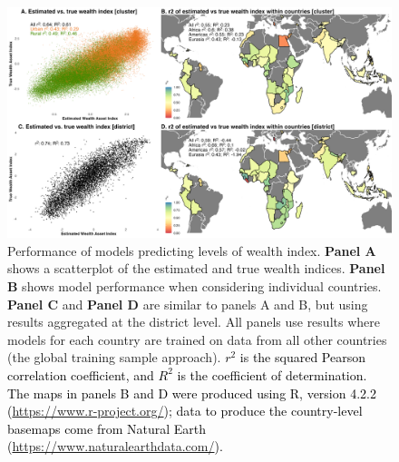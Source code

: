 \documentclass{article}
\begin{document}
\begin{figure}[H]
    \centering
    \includegraphics[width=1\textwidth]{figures/global_scatter_map.png}
    \caption{Performance of models predicting levels of wealth index. {\bf Panel A} shows a scatterplot of the estimated and true wealth indices. {\bf Panel B} shows model performance when considering individual countries. {\bf Panel C} and {\bf Panel D} are similar to panels A and B, but using results aggregated at the district level. All panels use results where models for each country are trained on data from all other countries (the global training sample approach). \textcolor{black}{ $r^2$ is the squared Pearson correlation coefficient, and $R^2$ is the coefficient of determination. The maps in panels B and D were produced using R, version 4.2.2 (\url{https://www.r-project.org/}); data to produce the country-level basemaps come from Natural Earth (\url{https://www.naturalearthdata.com/}).}}
     \label{fig:scatter_map}
\end{figure}
\end{document}
